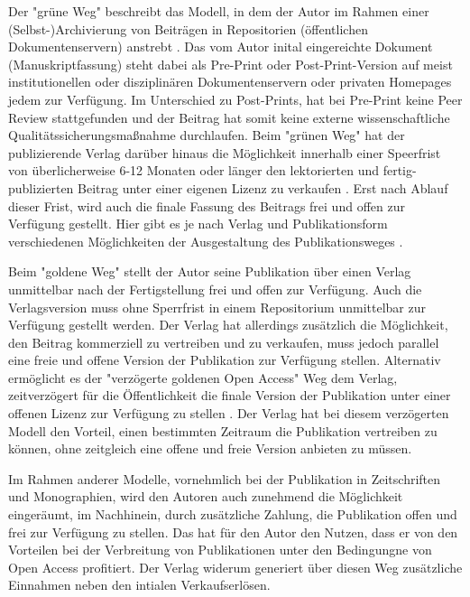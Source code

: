 Der "grüne Weg" beschreibt das Modell, in dem der Autor im Rahmen einer (Selbst-)Archivierung von Beiträgen in Repositorien (öffentlichen Dokumentenservern) anstrebt \cite{muller_2010_open}. Das vom Autor inital eingereichte Dokument (Manuskriptfassung) steht dabei als Pre-Print oder Post-Print-Version auf meist institutionellen oder disziplinären Dokumentenservern \cite{suchen} oder privaten Homepages \cite{suchen} jedem zur Verfügung. Im Unterschied zu Post-Prints, hat bei Pre-Print keine Peer Review stattgefunden \cite{suchen} und der Beitrag hat somit keine externe wissenschaftliche Qualitätssicherungsmaßnahme durchlaufen. Beim "grünen Weg" hat der publizierende Verlag darüber hinaus die Möglichkeit innerhalb einer Speerfrist von überlicherweise 6-12 Monaten \cite{suchen} oder länger den lektorierten und fertig-publizierten Beitrag unter einer eigenen Lizenz zu verkaufen \cite{suchen}. Erst nach Ablauf dieser Frist, wird auch die finale Fassung des Beitrags frei und offen zur Verfügung gestellt. Hier gibt es je nach Verlag und Publikationsform verschiedenen Möglichkeiten der Ausgestaltung des Publikationsweges \cite{suchen}.

Beim "goldene Weg" stellt der Autor seine Publikation über einen Verlag unmittelbar nach der Fertigstellung frei und offen zur Verfügung. Auch die Verlagsversion muss ohne Sperrfrist in einem Repositorium unmittelbar zur Verfügung gestellt werden. Der Verlag hat allerdings zusätzlich die Möglichkeit, den Beitrag kommerziell zu vertreiben und zu verkaufen, muss jedoch parallel eine freie und offene Version der Publikation zur Verfügung stellen. Alternativ ermöglicht es der "verzögerte goldenen Open Access" Weg dem Verlag, zeitverzögert für die Öffentlichkeit die finale Version der Publikation unter einer offenen Lizenz zur Verfügung zu stellen \cite{lewis_2012_inevitability}. Der Verlag hat bei diesem verzögerten Modell den Vorteil, einen bestimmten Zeitraum die Publikation vertreiben zu können, ohne zeitgleich eine offene und freie Version anbieten zu müssen.

Im Rahmen anderer Modelle, vornehmlich bei der Publikation in Zeitschriften und Monographien, wird den Autoren auch zunehmend die Möglichkeit eingeräumt, im Nachhinein, durch zusätzliche Zahlung, die Publikation offen und frei zur Verfügung zu stellen\cite{lewis_2012_inevitability}. Das hat für den Autor den Nutzen, dass er von den Vorteilen bei der Verbreitung von Publikationen unter den Bedingungne von Open Access profitiert. Der Verlag widerum generiert über diesen Weg zusätzliche Einnahmen neben den intialen Verkaufserlösen.

